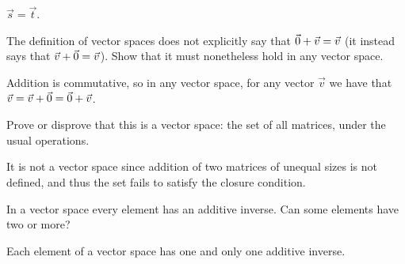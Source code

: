 \begin{exercises}
\begin{answer}
\begin{exparts}
          \( \vec{s}=\vec{t} \).
      \end{exparts}  
     \end{answer}
  \item 
    The definition of vector spaces does not explicitly say that
    \( \vec{0}+\vec{v}=\vec{v} \) 
    (it instead says that \( \vec{v}+\vec{0}=\vec{v} \)).
    Show that it must nonetheless hold in any vector space.
    \begin{answer}
      Addition is commutative, so in any vector space,
      for any vector \( \vec{v} \) we have that
      \( \vec{v}=\vec{v}+\vec{0}=\vec{0}+\vec{v} \).  
    \end{answer}
  \recommended \item
    Prove or disprove that 
    this is a vector space: the set of all matrices, under
    the usual operations.
    \begin{answer}
      It is not a vector space since addition of two matrices of unequal
      sizes is not defined, and thus the set fails to satisfy the closure
      condition.
    \end{answer}
  \item 
    In a vector space every element has an additive inverse.
    Can some elements have two or more?
    \begin{answer}
      Each element of a vector space has one and only one additive
      inverse.


\end{answer}
\end{exercises}
